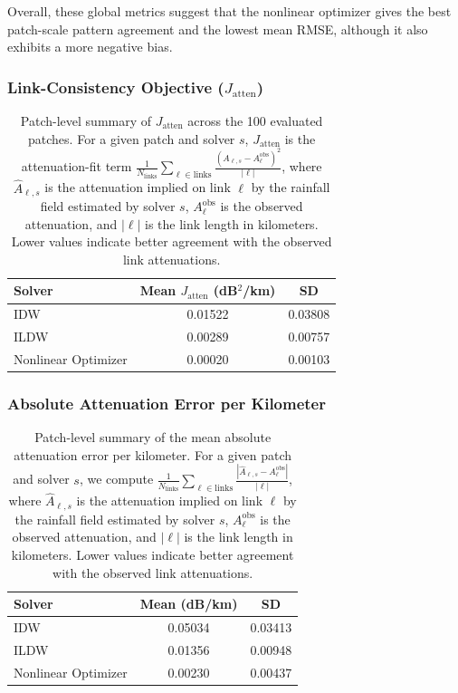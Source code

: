 Overall, these global metrics suggest that the nonlinear optimizer gives the best patch-scale pattern agreement and the lowest mean RMSE, although it also exhibits a more negative bias.

\subsubsection{Link-Consistency Objective ($J_{\mathrm{atten}}$)}
\begin{table}[!htbp]
  \centering
  \begin{tabular}{lcc}
    \toprule
    Solver & Mean $J_{\mathrm{atten}}$ (dB$^2$/km) & SD \\
    \midrule
    IDW & 0.01522 & 0.03808 \\
    ILDW & 0.00289 & 0.00757 \\
    Nonlinear Optimizer & 0.00020 & 0.00103 \\
    \bottomrule
  \end{tabular}
  \caption{Patch-level summary of $J_{\mathrm{atten}}$ across the 100 evaluated patches. For a given patch and solver $s$, $J_{\mathrm{atten}}$ is the attenuation-fit term $\frac{1}{N_{\mathrm{links}}}\sum_{\ell \in \mathrm{links}} \frac{\left(\hat{A}_{\ell,s} - A_\ell^{\mathrm{obs}}\right)^2}{|\ell|}$, where $\hat{A}_{\ell,s}$ is the attenuation implied on link $\ell$ by the rainfall field estimated by solver $s$, $A_\ell^{\mathrm{obs}}$ is the observed attenuation, and $|\ell|$ is the link length in kilometers. Lower values indicate better agreement with the observed link attenuations.}
\end{table}

\subsubsection{Absolute Attenuation Error per Kilometer}
\begin{table}[!htbp]
  \centering
  \begin{tabular}{lcc}
    \toprule
    Solver & Mean (dB/km) & SD \\
    \midrule
    IDW & 0.05034 & 0.03413 \\
    ILDW & 0.01356 & 0.00948 \\
    Nonlinear Optimizer & 0.00230 & 0.00437 \\
    \bottomrule
  \end{tabular}
  \caption{Patch-level summary of the mean absolute attenuation error per kilometer. For a given patch and solver $s$, we compute $\frac{1}{N_{\mathrm{links}}}\sum_{\ell \in \mathrm{links}} \frac{\left|\hat{A}_{\ell,s} - A_\ell^{\mathrm{obs}}\right|}{|\ell|}$, where $\hat{A}_{\ell,s}$ is the attenuation implied on link $\ell$ by the rainfall field estimated by solver $s$, $A_\ell^{\mathrm{obs}}$ is the observed attenuation, and $|\ell|$ is the link length in kilometers. Lower values indicate better agreement with the observed link attenuations.}
\end{table}

